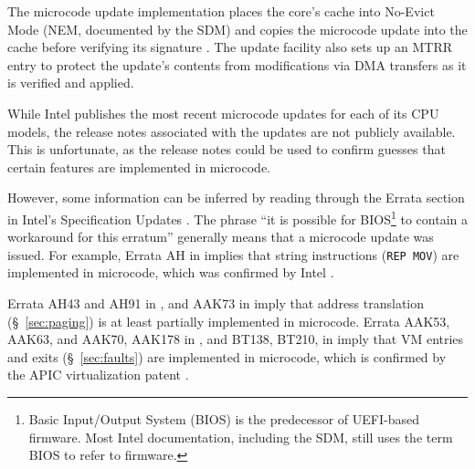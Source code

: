 
The microcode update implementation places the core's cache into No-Evict Mode
(NEM, documented by the SDM) and copies the microcode update into the cache
before verifying its signature \cite{intel2012patching}. The update facility
also sets up an MTRR entry to protect the update's contents from modifications
via DMA transfers \cite{intel2012patching} as it is verified and applied.

While Intel publishes the most recent microcode updates for each of its CPU
models, the release notes associated with the updates are not publicly
available. This is unfortunate, as the release notes could be used to confirm
guesses that certain features are implemented in microcode.

However, some information can be inferred by reading through the Errata section
in Intel's Specification Updates
\cite{intel2010errata, intel2015errata, intel2015errata2}. The phrase ``it is
possible for BIOS\footnote{Basic Input/Output System (BIOS) is the predecessor
of UEFI-based firmware. Most Intel documentation, including the SDM, still uses
the term BIOS to refer to firmware.} to contain a workaround for this erratum''
generally means that a microcode update was issued. For example, Errata AH in
\cite{intel2010errata} implies that string instructions (\texttt{REP MOV}) are
implemented in microcode, which was confirmed by Intel
\cite{abraham2006repmov}.


Errata AH43 and AH91 in \cite{intel2010errata}, and AAK73 in
\cite{intel2015errata} imply that address translation (\S~\ref{sec:paging}) is
at least partially implemented in microcode. Errata AAK53, AAK63, and AAK70,
AAK178 in \cite{intel2015errata}, and BT138, BT210,  in \cite{intel2015errata2}
imply that VM entries and exits (\S~\ref{sec:faults}) are implemented in
microcode, which is confirmed by the APIC virtualization patent
\cite{intel2014vapic}.

